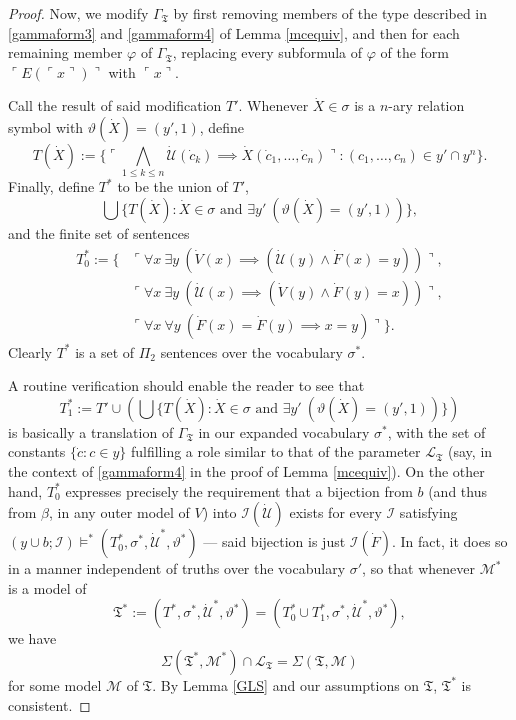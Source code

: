 \documentclass[12pt, twoside]{memoir}
\numberwithin{equation}{section}
\theoremstyle{definition}
\theoremstyle{remark}
\theoremstyle{definition}
\theoremstyle{definition}
\theoremstyle{definition}
\theoremstyle{remark}
\begin{document}
\begin{proof}
Now, we modify $\Gamma_{\mathfrak{T}}$ by first removing members of the type described in \ref{gammaform3} and \ref{gammaform4} of Lemma \ref{mcequiv}, and then for each remaining member $\varphi$ of $\Gamma_{\mathfrak{T}}$, replacing every subformula of $\varphi$ of the form $\ulcorner E(\ulcorner x \urcorner) \urcorner$ with $\ulcorner x \urcorner$. 

Call the result of said modification $T'$. Whenever $\dot{X} \in \sigma$ is a $n$-ary relation symbol with $\vartheta(\dot{X}) = (y', 1)$, define $$T(\dot{X}) := \{\ulcorner \bigwedge_{1 \leq k \leq n} \dot{\mathcal{U}}(\dot{c}_k) \implies \dot{X}(\dot{c}_1, \dots, \dot{c}_n) \urcorner : (c_1, \dots, c_n) \in y' \cap y^n\}.$$ Finally, define $T^*$ to be the union of $T'$, $$\bigcup \{T(\dot{X}) : \dot{X} \in \sigma \text{ and } \exists y' \ (\vartheta(\dot{X}) = (y', 1))\},$$ and the finite set of sentences
\begin{align*}
    T^*_0 := \{ & \ulcorner \forall x \ \exists y \ (\dot{V}(x) \implies (\dot{\mathcal{U}}(y) \wedge \dot{F}(x) = y)) \urcorner, \\
    & \ulcorner \forall x \ \exists y \ (\dot{\mathcal{U}}(x) \implies (\dot{V}(y) \wedge \dot{F}(y) = x)) \urcorner, \\
    & \ulcorner \forall x \ \forall y \ (\dot{F}(x) = \dot{F}(y) \implies x = y) \urcorner\} \text{.}
\end{align*}
Clearly $T^*$ is a set of $\Pi_2$ sentences over the vocabulary $\sigma^*$.

A routine verification should enable the reader to see that $$T^*_1 := T' \cup (\bigcup \{T(\dot{X}) : \dot{X} \in \sigma \text{ and } \exists y' \ (\vartheta(\dot{X}) = (y', 1))\})$$ is basically a translation of $\Gamma_{\mathfrak{T}}$ in our expanded vocabulary $\sigma^*$, with the set of constants $\{\dot{c} : c \in y\}$ fulfilling a role similar to that of the parameter $\mathcal{L}_{\mathfrak{T}}$ (say, in the context of \ref{gammaform4} in the proof of Lemma \ref{mcequiv}). On the other hand, $T^*_0$ expresses precisely the requirement that a bijection from $b$ (and thus from $\beta$, in any outer model of $V$) into $\mathcal{I}(\dot{\mathcal{U}})$ exists for every $\mathcal{I}$ satisfying $(y \cup b; \mathcal{I}) \models^* (T^*_0, \sigma^*,  \dot{\mathcal{U}}^*, \vartheta^*)$ --- said bijection is just $\mathcal{I}(\dot{F})$. In fact, it does so in a manner independent of truths over the vocabulary $\sigma'$, so that whenever $\mathcal{M}^*$ is a model of $$\mathfrak{T}^* := (T^*, \sigma^*, \dot{\mathcal{U}}^*, \vartheta^*) = (T^*_0 \cup T^*_1, \sigma^*,  \dot{\mathcal{U}}^*, \vartheta^*),$$ we have $$\Sigma(\mathfrak{T}^*, \mathcal{M}^*) \cap \mathcal{L}_{\mathfrak{T}} = \Sigma(\mathfrak{T}, \mathcal{M})$$ for some model $\mathcal{M}$ of $\mathfrak{T}$. By Lemma \ref{GLS} and our assumptions on $\mathfrak{T}$, $\mathfrak{T}^*$ is consistent. 


\end{proof}
\end{document}
